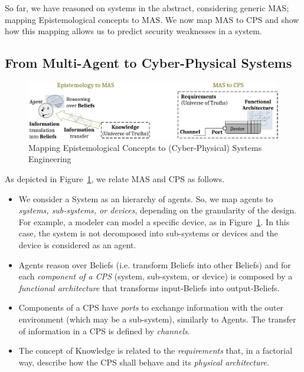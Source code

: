 \documentclass[conference]{IEEEtran}
\begin{document}
So far, we have reasoned on systems in the abstract, considering
generic MAS; mapping Epistemological concepts
to MAS. We now map MAS to CPS and show how this mapping allows us
to predict security weaknesses in a system.

\subsection{From Multi-Agent to Cyber-Physical Systems}
\begin{figure}[t]
	\centering
	\includegraphics[width=.8\textwidth]{mashyp.pdf}
	\caption{Mapping Epistemological Concepts to (Cyber-Physical) Systems Engineering}
	\label{fig:mashyp}
\end{figure}

As depicted in Figure~\ref{fig:mashyp}, we relate MAS and CPS as follows.
\begin{itemize}
	\item We consider a System as an hierarchy of agents. So, we map agents
		to \emph{systems, sub-systems, or devices}, depending on the
		granularity of the design. For example, a modeler can model a
		specific device, as in Figure~\ref{fig:mashyp}. In this case,
		the system is not decomposed into sub-systems or devices and
		the device is considered as an agent.
	\item Agents reason over Beliefs (i.e. transform Beliefs into other
		Beliefs) and for each \emph{component of a CPS} (system, sub-system,
		or device) is composed by a \emph{functional architecture} that
		transforms input-Beliefs into output-Beliefs.
	\item Components of a CPS have \emph{ports} to exchange information
		with the outer environment (which may be a sub-system),
		similarly to Agents. The transfer of information in a CPS is
		defined by \emph{channels}.
	\item The concept of Knowledge is related to the \emph{requirements}
		that, in a factorial way, describe how the CPS shall behave and
		its \emph{physical architecture}.

\end{itemize}
\end{document}
